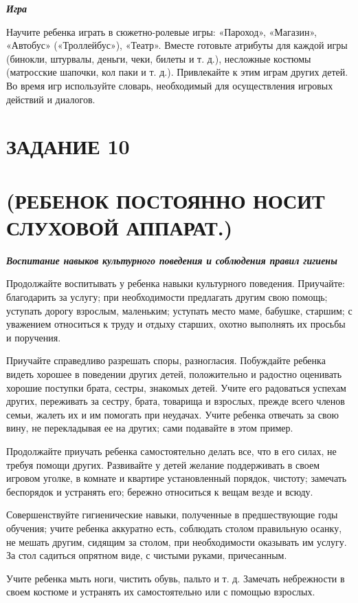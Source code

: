 \documentclass[a5paper]{book}
\renewcommand{\emph}[1]{\textit{#1}}
\begin{document}
\emph{\textbf{Игра}}

Научите ребенка играть в сюжетно-ролевые игры: «Пароход», «Магазин»,
«Автобус» («Троллейбус»), «Театр». Вместе готовьте атрибуты для каждой
игры (бинокли, штурвалы, деньги, чеки, билеты и т. д.), несложные
костюмы (матросские шапочки, кол паки и т. д.). Привлекайте к этим играм
других детей. Во время игр используйте словарь, необходимый для
осуществления игровых действий и диалогов.

\section{ЗАДАНИЕ 10}\section*{(РЕБЕНОК ПОСТОЯННО НОСИТ СЛУХОВОЙ АППАРАТ.)}

\textbf{\emph{Воспитание навыков культурного поведения и соблюдения
правил гигиены}}

Продолжайте воспитывать у ребенка навыки культурного поведения.
Приучайте: благодарить за услугу; при необходимости предлагать другим
свою помощь; уступать дорогу взрослым, маленьким; уступать место маме,
бабушке, старшим; с уважением относиться к труду и отдыху старших,
охотно выполнять их просьбы и поручения.

Приучайте справедливо разрешать споры, разногласия. Побуждайте ребенка
видеть хорошее в поведении других детей, положительно и радостно
оценивать хорошие поступки брата, сестры, знакомых детей. Учите его
радоваться успехам других, переживать за сестру, брата, товарища и
взрослых, прежде всего членов семьи, жалеть их и им помогать при
неудачах. Учите ребенка отвечать за свою вину, не перекладывая ее на
других; сами подавайте в этом пример.

Продолжайте приучать ребенка самостоятельно делать все, что в его силах,
не требуя помощи других. Развивайте у детей желание поддерживать в своем
игровом уголке, в комнате и квартире установленный порядок, чистоту;
замечать беспорядок и устранять его; бережно относиться к вещам везде и
всюду.

Совершенствуйте гигиенические навыки, полученные в предшествующие годы
обучения; учите ребенка аккуратно есть, соблюдать столом правильную
осанку, не мешать другим, сидящим за столом, при необходимости оказывать
им услугу. За стол садиться опрятном виде, с чистыми руками,
причесанным.

Учите ребенка мыть ноги, чистить обувь, пальто и т. д. Замечать
небрежности в своем костюме и устранять их самостоятельно или с помощью
взрослых.
\end{document}

